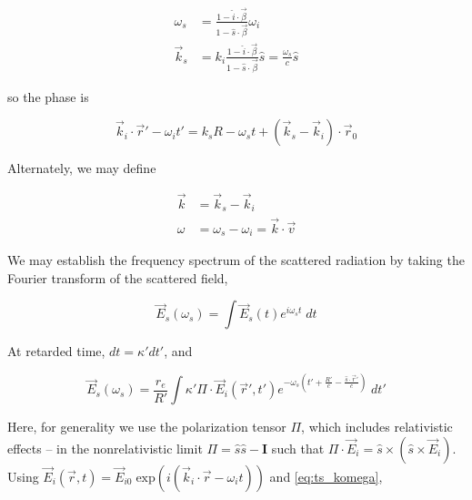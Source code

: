 \begin{equation}\label{eq:doppler}
 \begin{aligned}
  \omega_s &= \frac{1 - \hat{i} \cdot \vec{\beta}}{1 - \hat{s} \cdot \vec{\beta}} \omega_i\\
  \vec{k}_s &= k_i \frac{1 - \hat{i} \cdot \vec{\beta}}{1 - \hat{s} \cdot \vec{\beta}} \hat{s} = \frac{\omega_s}{c} \hat{s}
 \end{aligned}
\end{equation}

\noindent so the phase is

\begin{equation}
 \vec{k}_i \cdot \vec{r}' - \omega_i t' = k_s R - \omega_s t + \left( \vec{k}_s - \vec{k}_i \right) \cdot \vec{r}_0
\end{equation}

\noindent Alternately, we may define

\begin{equation}\label{eq:ts_komega}
 \begin{aligned}
  \vec{k} &= \vec{k}_s - \vec{k}_i\\
  \omega &= \omega_s - \omega_i = \vec{k} \cdot \vec{v}
 \end{aligned}
\end{equation}

We may establish the frequency spectrum of the scattered radiation by taking the Fourier transform of the scattered field,

\begin{equation}
 \vec{E}_s(\omega_s) = \int \vec{E}_s(t) e^{i\omega_s t} \;dt
\end{equation}

\noindent At retarded time, $dt = \kappa' dt'$, and

\begin{equation}\label{eq:Fourier}
 \vec{E}_s(\omega_s) = \frac{r_e}{R'} \int \kappa' \Pi \cdot \vec{E}_i(\vec{r}',t') e^{- \omega_s \left( t' + \frac{R'}{c} - \frac{\hat{s}\cdot\vec{r}'}{c}\right)} \;dt'
\end{equation}

\noindent Here, for generality we use the polarization tensor $\Pi$, which includes relativistic effects -- in the nonrelativistic limit $\Pi = \hat{s}\hat{s} - \textbf{I}$ such that $\Pi \cdot \vec{E}_i = \hat{s} \times \left( \hat{s} \times \vec{E}_i \right)$.  Using $\vec{E}_i(\vec{r},t) = \vec{E}_{i0} \;\mbox{exp}(i(\vec{k}_i \cdot \vec{r} - \omega_i t))$ and \cref{eq:ts_komega},

